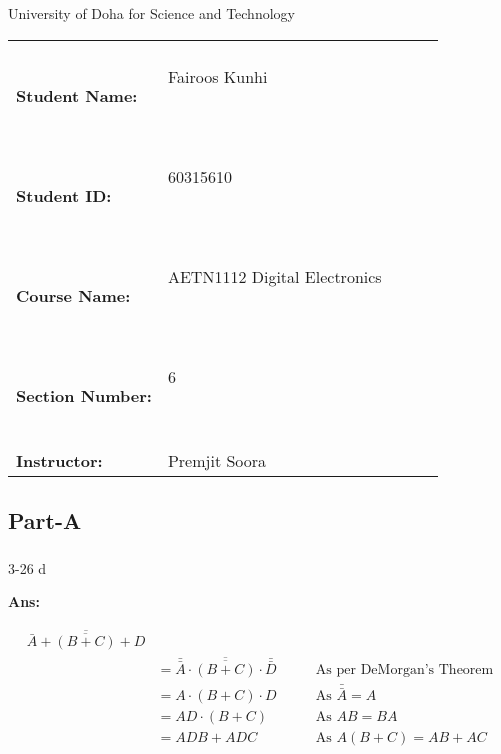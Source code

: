 \documentclass[
  a4paper,
]{article}
\author{}
\date{}
\makeatletter
\let\oldsubparagraph\subparagraph
\renewcommand{\subparagraph}{
    \@ifstar
      \xxxSubParagraphStar
      \xxxSubParagraphNoStar
  }
\newcommand{\xxxSubParagraphStar}[1]{\oldsubparagraph*{#1}\mbox{}}
\newcommand{\xxxSubParagraphNoStar}[1]{\oldsubparagraph{#1}\mbox{}}
\makeatother
\begin{document}
\vspace{20em}

\begin{center}
\end{center}

\medskip

\begin{center}
  \large{University of Doha for Science and Technology}
\end{center}

\vspace{50em}

\begin{tabular}{lp{5.0cm}lll}
  &  &  &  & \\
  \textbf{Student Name:} & Fairoos Kunhi

  \  &  &  & \\
  \textbf{Student ID:} & 60315610
  
  \  &  &  & \\
  \textbf{Course Name:} & AETN1112 Digital Electronics
  
  \  &  &  & \\
  \textbf{Section Number:} & 6
  
  \  &  &  & \\
  \textbf{Instructor:} & Premjit Soora
\end{tabular}


\newpage{}


\subsection{Part-A}\label{part-a}

\subparagraph{3-26 d}\label{d}

\textbf{Ans:}

\begin{align*}
  \overline{\bar{A} + \overline{(B+C)} + D} \\
  &= \bar{\bar{A}} \cdot \overline{\overline{(B+C)}} \cdot \bar{\bar{D}}
    &\qquad \text{As per DeMorgan's Theorem}\\
  &= A \cdot (B+C) \cdot D
    &\qquad \text{As } \bar{\bar{A}} = A \\
  &= AD \cdot (B+C)
    &\qquad \text{As } AB = BA \\
  &= ADB + ADC
    &\qquad \text{As } A(B+C) = AB + AC \\
\end{align*}
\end{document}
